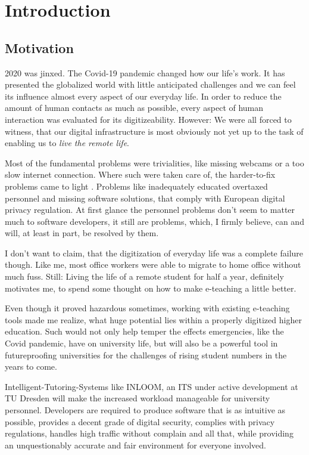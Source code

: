 \chapter{Introduction}
\label{ch:introduction}

\section[Motivation]{Motivation}
2020 was jinxed. The Covid-19 pandemic changed how our life's work.
It has presented the globalized world with little anticipated challenges
and we can feel its influence almost every aspect of our everyday life. 
In order to reduce the amount of human contacts as much as possible, every 
aspect of human interaction was evaluated for its digitizeability. 
However: We were all forced to witness, that our digital infrastructure is most 
obviously not yet up to the task of enabling us to \textit{live the remote life}.

Most of the fundamental problems were trivialities, like missing webcams or 
a too slow internet connection. Where such were taken care of, the harder-to-fix
problems came to light \cite{2}. Problems like inadequately educated overtaxed personnel 
and missing software solutions, that comply with European digital privacy regulation. 
At first glance the personnel problems don't seem to matter much to software developers,
it still are problems, which, I firmly believe, can and will, at least in part, be resolved 
by them. 

I don't want to claim, that the digitization of everyday life was a complete
failure though. Like me, most office workers were able to migrate to home office 
without much fuss. Still: Living the life of a remote student for half a year,
definitely motivates me, to spend some thought on how to make e-teaching a 
little better. 

Even though it proved hazardous sometimes, working with existing e-teaching 
tools made me realize, what huge potential lies within a properly digitized higher
education. Such would not only help temper the effects emergencies, like the Covid
pandemic, have on university life, but will also be a powerful tool in futureproofing
universities \cite{4} for the challenges of rising student numbers \cite{3} in the 
years to come.

Intelligent-Tutoring-Systems like INLOOM, an ITS under active development at TU 
Dresden will make the increased workload manageable for university personnel. 
Developers are required to produce software that is as intuitive as possible, provides
a decent grade of digital security, complies with privacy regulations, handles high 
traffic without complain and all that, while providing an unquestionably accurate and 
fair environment for everyone involved. 

